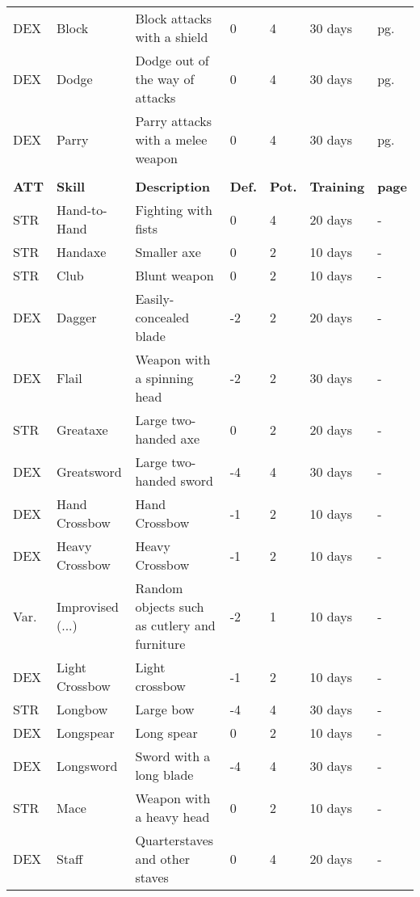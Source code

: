 \begin{center}
\begin{xltabular}{\textwidth}{l l X l l l l}
        DEX & Block & Block attacks with a shield & 0 & 4 & 30 days & pg. \pageref{skill:block} \\
        DEX & Dodge & Dodge out of the way of attacks & 0 & 4 & 30 days & pg. \pageref{skill:dodge} \\
        DEX & Parry & Parry attacks with a melee weapon & 0 & 4 & 30 days & pg. \pageref{skill:parry} \\
         \\*
        \textbf{ATT} & \textbf{Skill} & \textbf{Description} & \textbf{Def.} & \textbf{Pot.} & \textbf{Training} & \textbf{page} \\*
        STR & Hand-to-Hand & Fighting with fists & 0 & 4 & 20 days & - \\
        STR & Handaxe & Smaller axe & 0 & 2 & 10 days & - \\
        STR & Club & Blunt weapon & 0 & 2 & 10 days & - \\
        DEX & Dagger & Easily-concealed blade & -2 & 2 & 20 days & - \\
        DEX & Flail & Weapon with a spinning head & -2 & 2 & 30 days & - \\ %
        STR & Greataxe & Large two-handed axe & 0 & 2 & 20 days & - \\
        DEX & Greatsword & Large two-handed sword & -4 & 4 & 30 days & - \\ %
        DEX & Hand Crossbow & Hand Crossbow & -1 & 2 & 10 days & - \\
        DEX & Heavy Crossbow & Heavy Crossbow & -1 & 2 & 10 days & - \\
        Var. & Improvised (...) & Random objects such as cutlery and furniture & -2 & 1 & 10 days & - \\
        DEX & Light Crossbow & Light crossbow & -1 & 2 & 10 days & - \\
        STR & Longbow & Large bow & -4 & 4 & 30 days & - \\ %
        DEX & Longspear & Long spear & 0 & 2 & 10 days & - \\
        DEX & Longsword & Sword with a long blade & -4 & 4 & 30 days & - \\
        STR & Mace & Weapon with a heavy head & 0 & 2 & 10 days & - \\ %
        DEX & Staff & Quarterstaves and other staves & 0 & 4 & 20 days & - \\

\end{xltabular}
\end{center}
